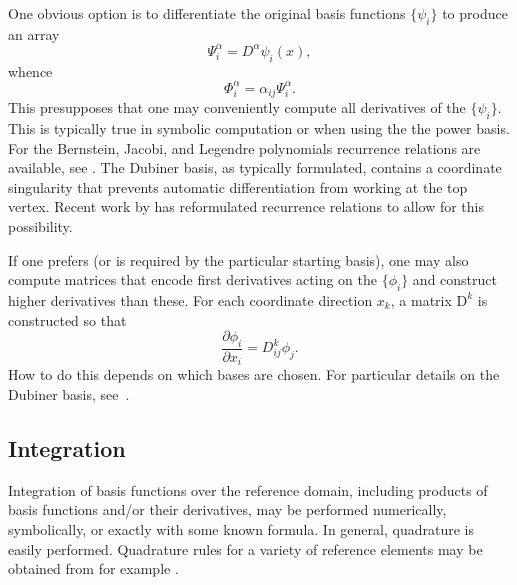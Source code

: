 One obvious option is to differentiate the
original basis functions \( \{ \psi_i \} \) to produce an array
\begin{equation}
\Psi^\alpha_i = D^\alpha \psi_i(x),
\end{equation}
whence
\begin{equation}
\Phi^\alpha_i = \alpha_{ij} \Psi^\alpha_i.
\end{equation}
This presupposes that one may conveniently compute all derivatives of
the \( \{ \psi_i \} \).  This is typically true in symbolic
computation or when using the the power basis.  
For the Bernstein, Jacobi, and Legendre
 polynomials recurrence relations are
available, see \citep{KarniadakisSherwin2005,Kirby2010}.  
The Dubiner basis, as typically formulated, contains a coordinate
singularity that prevents automatic differentiation from working at
the top vertex.  Recent work by \citet{Kirby} has reformulated recurrence
relations to allow for this possibility.

If one prefers (or is required by the particular starting basis), one
may also compute matrices that encode first derivatives acting on the
\( \{ \phi_i \} \) and construct higher derivatives than these.
For each coordinate direction \( x_k \), a matrix \( \mathrm{D}^k \)
is constructed so that
\begin{equation}
\frac{\partial \phi_i}{\partial x_i} =
D^k_{ij} \phi_j.
\end{equation}
How to do this depends on which bases are chosen.  For particular
details on the Dubiner basis, see~\citep{Dubiner1991}.  

\subsection{Integration}
Integration of basis functions over the reference domain, including products of
basis functions and/or their derivatives, may be performed numerically,
symbolically, or exactly with some known formula. 
In general, quadrature is easily performed. 
Quadrature rules for a variety of reference elements may 
be obtained from for example \citep{Dunavant1985,KeeganRidzalBochev2008,SolinSegethDolevzel2004}.

